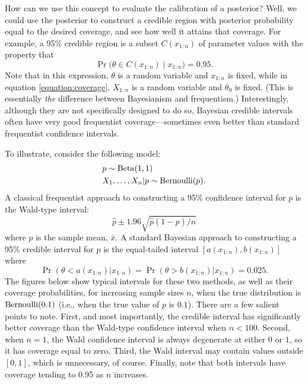 \documentclass[12pt]{article}
\begin{document}
How can we use this concept to evaluate the calibration of a posterior? Well, we could use the posterior to construct a credible region with posterior probability equal to the desired coverage, and see how well it attains that coverage. For example, a 95\% credible region is a subset $C(x_{1:n})$ of parameter values with the property that 
$$ \Pr\big(\theta \in C(x_{1:n}) \;\big\vert\; x_{1:n}) = 0.95. $$
Note that in this expression, $\theta$ is a random variable and $x_{1:n}$ is fixed, while in equation \ref{equation:coverage}, $X_{1:n}$ is a random variable and $\theta_0$ is fixed. (This is essentially \textit{the} difference between Bayesianism and frequentism.)
Interestingly, although they are not specifically designed to do so, Bayesian credible intervals often have very good frequentist coverage---sometimes even better than standard frequentist confidence intervals. 

To illustrate, consider the following model:
\begin{align*}
& p \sim \operatorname*{Beta}(1,1)\\
& X_1,\ldots,X_n | p \sim \operatorname*{Bernoulli}(p).
\end{align*}
A classical frequentist approach to constructing a 95\% confidence interval for $p$ is the Wald-type interval:
$$ \hat p \pm 1.96 \sqrt{\hat p (1-\hat p) / n}$$
where $\hat p$ is the sample mean, $\bar x$. A standard Bayesian approach to constructing a 95\% credible interval for $p$ is the equal-tailed interval $[a(x_{1:n}),b(x_{1:n})]$ where 
$$ \Pr(\theta<a(x_{1:n}) | x_{1:n}) = \Pr(\theta>b(x_{1:n}) | x_{1:n}) = 0.025. $$
The figures below show typical intervals for these two methods, as well as their coverage probabilities, for increasing sample sizes $n$, when the true distribution is $\operatorname*{Bernoulli}(0.1)$ (i.e., when the true value of $p$ is $0.1$).  There are a few salient points to note. First, and most importantly, the credible interval has significantly better coverage than the Wald-type confidence interval when $n < 100$. Second, when $n = 1$, the Wald confidence interval is always degenerate at either $0$ or $1$, so it has coverage equal to zero. Third, the Wald interval may contain values outside $[0,1]$, which is unnecessary, of course. Finally, note that both intervals have coverage tending to 0.95 as $n$ increases.
\end{document}
